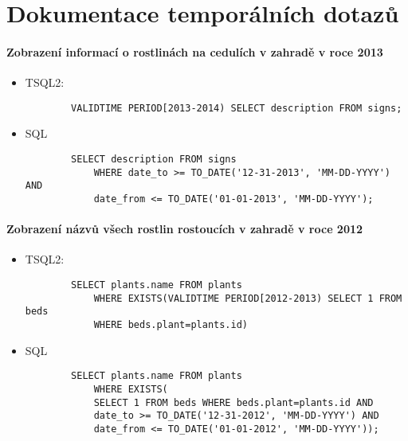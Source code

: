\documentclass[12pt,a4paper]{article}
\begin{document}
\section*{Dokumentace temporálních dotazů}

\paragraph*{Zobrazení informací o rostlinách na cedulích v zahradě v roce 2013}
\begin{itemize}

	\item
	TSQL2:
		\begin{verbatim}
		VALIDTIME PERIOD[2013-2014) SELECT description FROM signs;
		\end{verbatim}
	\item
	SQL
		\begin{verbatim}
		SELECT description FROM signs
			WHERE date_to >= TO_DATE('12-31-2013', 'MM-DD-YYYY') AND
			date_from <= TO_DATE('01-01-2013', 'MM-DD-YYYY');
		\end{verbatim}

\end{itemize}

\paragraph*{Zobrazení názvů všech rostlin rostoucích v zahradě v roce 2012}
\begin{itemize}

	\item
	TSQL2:
		\begin{verbatim}
		SELECT plants.name FROM plants 
			WHERE EXISTS(VALIDTIME PERIOD[2012-2013) SELECT 1 FROM beds 
			WHERE beds.plant=plants.id)
		\end{verbatim}
	\item
	SQL
		\begin{verbatim}
		SELECT plants.name FROM plants
			WHERE EXISTS(
    		SELECT 1 FROM beds WHERE beds.plant=plants.id AND
    		date_to >= TO_DATE('12-31-2012', 'MM-DD-YYYY') AND
    		date_from <= TO_DATE('01-01-2012', 'MM-DD-YYYY'));
		\end{verbatim}

\end{itemize}
\end{document}
